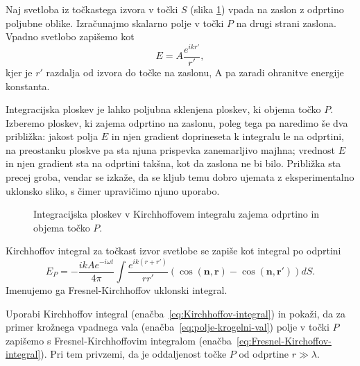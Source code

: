 Naj svetloba iz točkastega izvora v točki $S$ (slika \ref{fig:UklonFK}) vpada na zaslon
z odprtino poljubne oblike. Izračunajmo skalarno polje v točki $P$ na drugi 
strani zaslona. Vpadno svetlobo zapišemo kot
\begin{equation}
\label{eq:polje-krogelni-val}
E = A \frac{e^{ikr'}}{r'},
\end{equation}
kjer je $r'$ razdalja od izvora do točke na zaslonu, A pa zaradi ohranitve energije konstanta.

Integracijska ploskev je lahko poljubna sklenjena ploskev, ki objema točko $P$. 
Izberemo ploskev, ki zajema odprtino na zaslonu, poleg tega pa naredimo še dva približka:
jakost polja $E$ in njen gradient doprineseta k integralu le na odprtini, na preostanku ploskve
pa sta njuna prispevka zanemarljivo majhna; vrednost $E$ in njen gradient sta na 
odprtini takšna, kot da zaslona ne bi bilo.
Približka sta precej groba, vendar se izkaže, da se kljub temu
dobro ujemata z eksperimentalno uklonsko sliko, s čimer 
upravičimo njuno uporabo.
\begin{figure}[h]
\centering {} 
  
\caption{Integracijska ploskev v Kirchhoffovem integralu zajema odprtino in objema točko $P$.}
\label{fig:UklonFK}
\end{figure}

Kirchhoffov integral za točkast izvor svetlobe se zapiše kot integral po odprtini
\begin{equation}
E_P = -\frac{ik A e^{-i\omega t}}{4\pi}\int\frac{e^{ik(r+r')}}{rr'}\left(\cos(\mathbf{n},
\mathbf{r})-\cos(\mathbf{n},\mathbf{r'})\right) dS.
\label{eq:Fresnel-Kirchoffov-integral}
\end{equation}
Imenujemo ga Fresnel-Kirchhoffov uklonski integral.
\begin{definition}
\label{naloga-Fresnel-Kirchhoff-uklon}
Uporabi Kirchhoffov integral (enačba~\ref{eq:Kirchhoffov-integral}) in pokaži, da 
za primer krožnega vpadnega vala (enačba~\ref{eq:polje-krogelni-val}) polje v točki 
$P$ zapišemo s Fresnel-Kirchhoffovim integralom (enačba~\ref{eq:Fresnel-Kirchoffov-integral}). 
Pri tem privzemi, da je oddaljenost točke $P$ od odprtine $r \gg \lambda$.
\end{definition}

